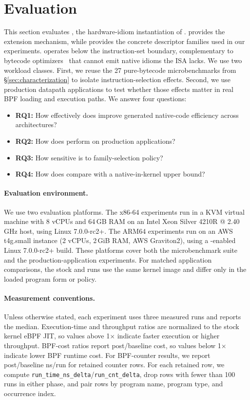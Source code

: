 \section{Evaluation}
\label{sec:eval}


This section evaluates \lang, the hardware-idiom instantiation of \tool. \tool provides the extension mechanism, while \lang provides the concrete descriptor families used in our experiments. \lang operates below the instruction-set boundary, complementary to bytecode optimizers~\cite{xu2021synthesizing,mao2024merlin,zhu2025epso} that cannot emit native idioms the ISA lacks. We use two workload classes. First, we reuse the 27 pure-bytecode microbenchmarks from \S\ref{sec:characterization} to isolate instruction-selection effects. Second, we use production datapath applications to test whether those effects matter in real BPF loading and execution paths. We answer four questions:

\begin{itemize}
\item \textbf{RQ1:} How effectively does \lang improve generated native-code efficiency across architectures?
\item \textbf{RQ2:} How does \lang perform on production applications?
\item \textbf{RQ3:} How sensitive is \lang to family-selection policy?
\item \textbf{RQ4:} How does \tool compare with a native-in-kernel upper bound?
\end{itemize}

\paragraph{Evaluation environment.}

We use two evaluation platforms. The x86-64 experiments run in a KVM virtual machine with 8 vCPUs and 64\,GB RAM on an Intel Xeon Silver 4210R @ 2.40\,GHz host, using Linux 7.0.0-rc2+. The ARM64 experiments run on an AWS t4g.small instance (2 vCPUs, 2\,GiB RAM, AWS Graviton2), using a \lang-enabled Linux 7.0.0-rc2+ build. These platforms cover both the microbenchmark suite and the production-application experiments. For matched application comparisons, the stock and \lang runs use the same kernel image and differ only in the loaded program form or \lang policy.

\paragraph{Measurement conventions.}
Unless otherwise stated, each experiment uses three measured runs and reports the median. Execution-time and throughput ratios are normalized to the stock kernel eBPF JIT, so values above 1$\times$ indicate faster execution or higher throughput. BPF-cost ratios report post/baseline cost, so values below 1$\times$ indicate lower BPF runtime cost. For BPF-counter results, we report post/baseline ns/run for retained counter
rows. For each retained row, we compute \texttt{run\_time\_ns\_delta}/\texttt{run\_cnt\_delta}, drop rows with fewer than 100 runs in either phase, and pair rows by program name, program type, and occurrence index.

